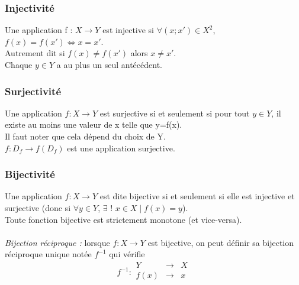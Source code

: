 \documentclass[a4paper,10pt]{book}
\begin{document}
\subsubsection{Injectivité}
Une application f : $X \longrightarrow Y$ est injective si $\forall (x;x')\in X^{2}$, $f(x)=f(x') \Leftrightarrow x=x'$.\\
Autrement dit si $f(x) \neq f(x')$ alors $x \neq x'$.\\
Chaque $y \in Y$ a au plus un seul antécédent.

\subsubsection{Surjectivité}
Une application $f : X \longrightarrow Y$ est surjective si et seulement si pour tout $y \in Y$, il existe au moins une valeur de x telle que y=f(x).\\
Il faut noter que cela dépend du choix de Y.\\
$f : D_{f} \longrightarrow f(D_{f})$ est une application surjective.

\subsubsection{Bijectivité}
Une application $f : X \longrightarrow Y$ est dite bijective si et seulement si elle est injective et surjective (donc si $\forall y \in Y$, $\exists$ $!$ $x \in X \mid f(x)=y$).\\
Toute fonction bijective est strictement monotone (et vice-versa).\\

\paragraph{} \textit{Bijection réciproque :} lorsque $f : X \longrightarrow Y$ est bijective, on peut définir sa bijection réciproque unique notée $f^{-1}$ qui vérifie \begin{displaymath} f^{-1} : 
\begin{array}{rcl}
Y &\longrightarrow & X\\
f(x) &\longrightarrow & x\\ \end{array}
\end{displaymath}
\end{document}
